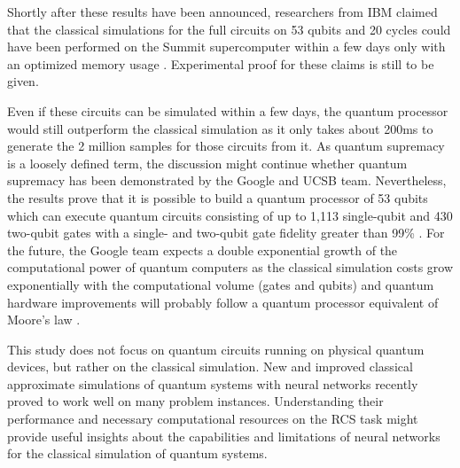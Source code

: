Shortly after these results have been announced, researchers from IBM claimed that the classical simulations
for the full circuits on 53 qubits and 20 cycles could have been performed
on the Summit supercomputer within a few days only with an optimized memory
usage \cite{pednault2019leveraging}. Experimental proof for these claims is still to be given.

Even if these circuits can be simulated within a few days, the quantum
processor would still outperform the classical simulation as it only
takes about 200ms to generate the 2 million samples for those circuits from it. As quantum
supremacy is a loosely defined term, the discussion might continue whether
quantum supremacy has been demonstrated by the Google and UCSB team. Nevertheless, 
the results prove that it is possible to build a quantum processor of 53 qubits
which can execute quantum circuits consisting of up to 1,113 single-qubit and
430 two-qubit gates with a single- and two-qubit gate fidelity greater than 99\% \cite{martines2019supremacy}.
For the future, the Google team expects a double exponential growth of the computational
power of quantum computers as the classical simulation costs grow exponentially
with the computational volume (gates and qubits) and quantum hardware
improvements will probably follow a quantum processor equivalent of Moore's law \cite{martines2019supremacy}.

This study does not focus on quantum circuits running on physical quantum devices,
but rather on the classical simulation. New and improved classical
approximate simulations of quantum systems with neural networks recently proved
to work well on many problem instances. 
Understanding their performance and necessary computational resources on
the RCS task might provide useful insights about the capabilities and
limitations of neural networks for the classical simulation of quantum systems.
